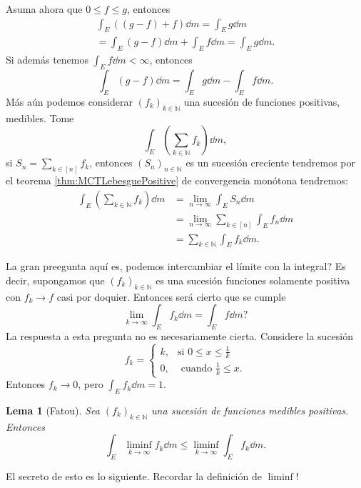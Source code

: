 \documentclass[12pt]{article}
\theoremstyle{plain}
\newtheorem{Lem}[Th]{Lema}             %
\theoremstyle{definition}
\theoremstyle{remark}
\numberwithin{equation}{section}
\newcommand{\bN}{\mathbb{N}}        %
\renewcommand{\leq}{\leqslant}      %
\renewcommand{\:}{\colon}           %
\newcommand{\bonj}[1]{\left\lbrack#1\right\rbrack}
\begin{document}
\begin{multicols}{2}
Asuma ahora que $0\leq f\leq g$, entonces
\begin{gather*}
  \int_E\left((g-f)+f\right)\dd m=\int_Eg\dd m\\
  =\int_E(g-f)\dd m+\int_Ef\dd m=\int_Eg\dd m.
\end{gather*}
Si además tenemos $\int_Ef\dd m<\infty$, entonces
$$\int_E(g-f)\dd m=\int_Eg\dd m-\int_Ef\dd m.$$
Más aún podemos considerar $(f_k)_{k\in\bN}$ una sucesión de funciones positivas, medibles. Tome
$$\int_E\left(\sum_{k\in\bN}f_k\right)\dd m,$$
si $S_n=\sum_{k\in\bonj{n}}f_k$, entonces $(S_n)_{n\in\bN}$ es un sucesión creciente tendremos por el teorema \ref{thm:MCTLebesguePositive} de convergencia monótona tendremos:
\begin{align*}
 \int_E\left(\sum_{k\in\bN}f_k\right)\dd m&=\lim_{n\to\infty}\int_E S_n\dd m\\
 &=\lim_{n\to\infty}\sum_{k\in\bonj{n}}\int_E f_n\dd m\\
 &=\sum_{k\in\bN}\int_E f_k\dd m.
\end{align*}

La gran preegunta aquí es, podemos intercambiar el límite con la integral? Es decir, supongamos que $(f_k)_{k\in\bN}$ es una sucesión funciones solamente positiva con $f_k\to f$ casi por doquier. Entonces será cierto que se cumple
$$\lim_{k\to\infty}\int_Ef_k\dd m=\int_E f\dd m?$$
La respuesta a esta pregunta no es necesariamente cierta. Considere la sucesión
$$
f_k=\begin{cases}
      k, & \mbox{si } 0\leq x\leq \frac{1}{k}\\
      0, & \text{ cuando } \frac{1}{k}\leq x.
    \end{cases}
$$
Entonces $f_k\to 0$, pero $\int_Ef_k\dd m=1$.

\begin{Lem}[Fatou]\label{lem:FatouPositive}
  Sea $(f_k)_{k\in\bN}$ una sucesión de funciones medibles positivas. Entonces
  $$\int_E\liminf_{k\to\infty}f_k\dd m\leq \liminf_{k\to\infty}\int_Ef_k\dd m.$$
\end{Lem}
El secreto de esto es lo siguiente. Recordar la definición de $\liminf$!


\end{multicols}
\end{document}
